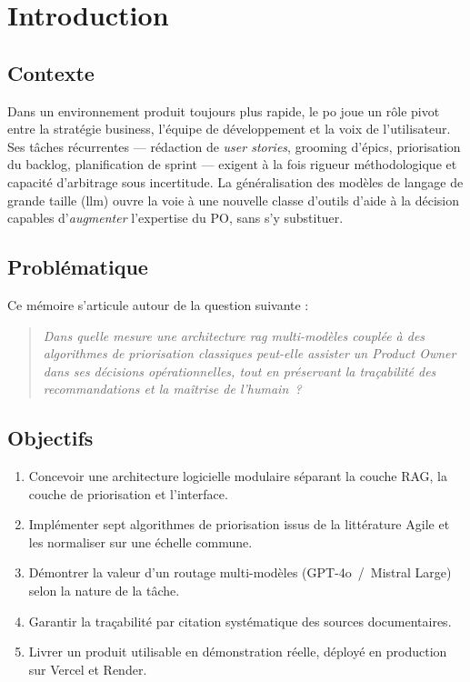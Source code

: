 \chapter{Introduction}
\label{ch:intro}

\section{Contexte}
Dans un environnement produit toujours plus rapide, le \gls{po} joue un
rôle pivot entre la stratégie business, l'équipe de développement et la
voix de l'utilisateur. Ses tâches récurrentes --- rédaction de
\textit{user stories}, grooming d'épics, priorisation du backlog,
planification de sprint --- exigent à la fois rigueur méthodologique et
capacité d'arbitrage sous incertitude. La généralisation des modèles
de langage de grande taille (\gls{llm}) ouvre la voie à une nouvelle
classe d'outils d'aide à la décision capables d'\emph{augmenter}
l'expertise du PO, sans s'y substituer.

\section{Problématique}
Ce mémoire s'articule autour de la question suivante :
\begin{quote}\itshape
Dans quelle mesure une architecture \gls{rag} multi-modèles couplée
à des algorithmes de priorisation classiques peut-elle assister un
Product Owner dans ses décisions opérationnelles, tout en préservant
la traçabilité des recommandations et la maîtrise de l'humain~?
\end{quote}

\section{Objectifs}
\begin{enumerate}
  \item Concevoir une architecture logicielle modulaire séparant la
        couche RAG, la couche de priorisation et l'interface.
  \item Implémenter sept algorithmes de priorisation issus de la
        littérature Agile et les normaliser sur une échelle commune.
  \item Démontrer la valeur d'un routage multi-modèles
        (GPT-4o~/~Mistral Large) selon la nature de la tâche.
  \item Garantir la traçabilité par citation systématique des
        sources documentaires.
  \item Livrer un produit utilisable en démonstration réelle, déployé
        en production sur Vercel et Render.
\end{enumerate}

